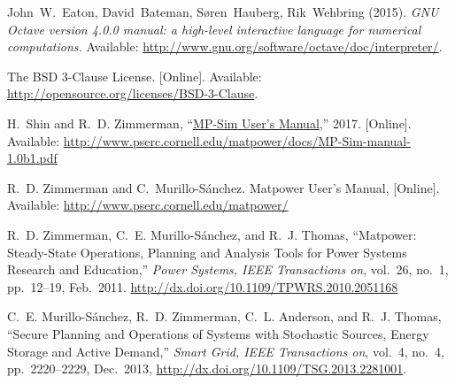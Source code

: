 \documentclass[12pt]{article}
\newcommand{\matpower}[0]{{\sc Matpower}}
\newcommand{\matpowerurl}[0]{http://www.pserc.cornell.edu/matpower/}
\newcommand{\mpsim}[0]{{MP-Sim}}
\newcommand{\mpsimver}[0]{1.0b1}
\newcommand{\mpsimmanurl}[0]{http://www.pserc.cornell.edu/matpower/docs/MP-Sim-manual-\mpsimver.pdf}
\newcommand{\mpsimman}[0]{\href{\mpsimmanurl}{\mpsim{} User's Manual}}
\numberwithin{equation}{section}
\numberwithin{table}{section}
\numberwithin{figure}{section}
\begin{document}
\clearpage
\begin{thebibliography}{99}

John~W.~Eaton, David~Bateman, S{\o}ren~Hauberg, Rik~Wehbring (2015). \emph{GNU Octave version 4.0.0 manual: a high-level interactive language for numerical computations.} Available: \url{http://www.gnu.org/software/octave/doc/interpreter/}.

The BSD 3-Clause License. [Online]. Available: \url{http://opensource.org/licenses/BSD-3-Clause}.

H.~Shin and R.~D. Zimmerman, ``\mpsimman{},'' 2017.
  [Online]. Available: \url{\mpsimmanurl}

R.~D. Zimmerman and C.~Murillo-S{\'a}nchez. \matpower{} User's Manual,
  [Online]. Available: \url{\matpowerurl}

R.~D. Zimmerman, C.~E. Murillo-S{\'a}nchez, and R.~J. Thomas, ``\matpower{}: Steady-State Operations, Planning and Analysis Tools for Power Systems Research and Education,'' \emph{Power Systems, IEEE Transactions on}, vol.~26, no.~1, pp.~12--19, Feb.~2011. \url{http://dx.doi.org/10.1109/TPWRS.2010.2051168}

C.~E. Murillo-S{\'a}nchez, R.~D. Zimmerman, C.~L. Anderson, and R.~J. Thomas, ``Secure Planning and Operations of Systems with Stochastic Sources, Energy Storage and Active Demand,'' \emph{Smart Grid, IEEE Transactions on}, vol.~4, no.~4, pp.~2220--2229, Dec.~2013,
\url{http://dx.doi.org/10.1109/TSG.2013.2281001}.

\end{thebibliography}
\end{document}
